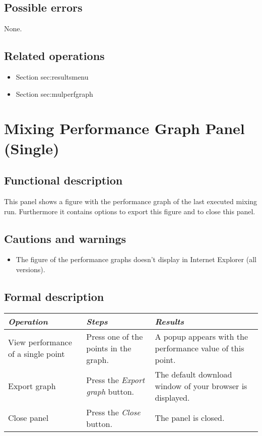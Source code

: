   \subsection*{Possible errors}
  None.

  \subsection*{Related operations}
   \begin{itemize}
   \item Section {sec:resultsmenu}
   \item Section {sec:mulperfgraph}
  \end{itemize}

\section{Mixing Performance Graph Panel (Single)}
\label{sec:singperfgraph}
  \subsection*{Functional description}
  This panel shows a figure with the performance graph of the last executed mixing run. Furthermore it contains options to export this figure and to close this panel.

  \subsection*{Cautions and warnings}
  \begin{itemize}
  \item The figure of the performance graphs doesn't display in Internet Explorer (all versions).
  \end{itemize}

  \subsection*{Formal description}
    \begin{tabularx}{\textwidth}{XXX}
    \toprule
    \emph{Operation} & \emph{Steps} & \emph{Results} \\
    \midrule
    View performance of a single point & Press one of the points in the graph. & A popup appears with the performance value of this point. \\
    \midrule
    Export graph & Press the \emph{Export graph} button. & The default download window of your browser is displayed. \\
    \midrule
    Close panel & Press the \emph{Close} button. & The panel is closed. \\
    \bottomrule
\end{tabularx}

